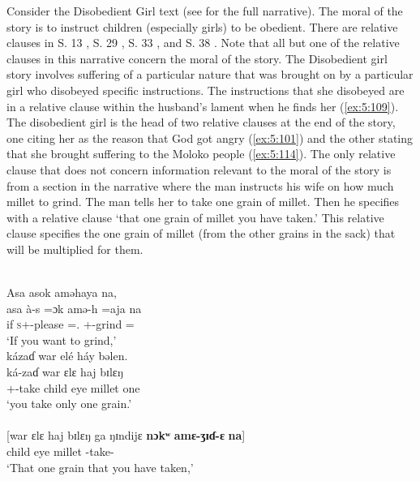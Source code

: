 Consider the Disobedient Girl text (see  for the full narrative). The moral of the story is to instruct children (especially girls) to be obedient. There are relative clauses in S. 13 , S. 29 , S. 33 , and S. 38 . Note that all but one  of the relative clauses in this narrative concern the moral of the story. The Disobedient girl story involves suffering of a particular nature that was brought on by a particular girl who disobeyed specific instructions. The instructions that she disobeyed are in a relative clause within the husband’s lament when he finds her (\ref{ex:5:109}). The disobedient girl is the head of two relative clauses at the end of the story, one citing her as the reason that God got angry (\ref{ex:5:101}) and the other stating that she brought suffering to the Moloko people (\ref{ex:5:114}). The only relative clause that does not concern information relevant to the moral of the story  is from a section in the narrative where the man instructs his wife on how much millet to grind. The man tells her to take one grain of millet. Then he specifies with a relative clause ‘that one grain of millet you have taken.’ This relative clause specifies the one grain of millet (from the other grains in the sack) that will be multiplied for them. 

\ea \label{ex:5:115}\\
Asa  asok  aməhaya  na, \\  
\gll  asa  à-s          =ɔk amə-h            =aja  na\\
      if     \textsc{s}+{\PFV}-please ={\twoS}.{\IO}  {\DEP}+{\PFV}-grind ={\PLU}    {\PSP}\\
\glt  ‘If you want to grind,’\\
\medskip
kázaɗ  war  elé  háy  bəlen.\\
\gll  ká-zaɗ war ɛlɛ haj bɪlɛŋ\\
      {\twoS}+{\IFV}-take  child    eye  millet  one\\
\glt  ‘you take only one grain.’\\
\\
\gll {}[war ɛlɛ haj bɪlɛŋ ga ŋɪndijɛ \textbf{nɔkʷ} \textbf{amɛ-ʒɪɗ-ɛ} \textbf{na}]\\
     child  eye       millet     {\DEM}  {\ADJ}  {\DEM}  {\twoS}   {\DEP}-take{}-{\CL}    {\PSP}\\
\glt ‘That one grain that you have taken,’\\

